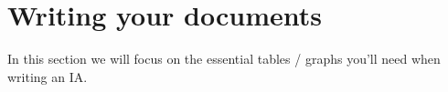 %
%
%
%
%
\section{Writing your documents}
In this section we will focus on the essential tables / graphs you'll need when writing an IA.

